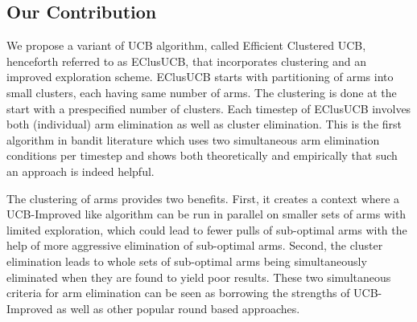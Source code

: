 \subsection{Our Contribution}
We propose a variant of UCB algorithm, called Efficient Clustered UCB, henceforth referred to as EClusUCB, that incorporates clustering and an improved exploration scheme. EClusUCB starts with partitioning of arms into small clusters, each having same number of arms. The clustering is done at the start with a prespecified number of clusters. 
Each timestep of EClusUCB involves both (individual) arm elimination as well as cluster elimination. This is the first algorithm in bandit literature which uses two simultaneous arm elimination conditions per timestep and shows both theoretically and empirically that such an approach is indeed helpful.



The clustering of arms provides two benefits. First, it creates a context where a UCB-Improved like algorithm can be run in parallel on smaller sets of arms with limited exploration, which could lead to fewer pulls of sub-optimal arms with the help of  more aggressive elimination of sub-optimal arms. Second, the cluster elimination leads to whole sets of sub-optimal arms being simultaneously eliminated when they are found to yield poor results. These two simultaneous criteria for arm elimination can be seen as borrowing the strengths of UCB-Improved as well as other popular round based approaches. 

